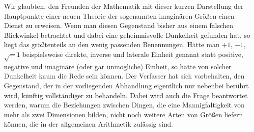 \newpage
Wir glaubten, den Freunden der Mathematik mit dieser kurzen Darstellung der Hauptpunkte einer neuen Theorie der sogenannten imaginären Größen einen Dienst zu erweisen. Wenn man diesen Gegenstand bisher aus einem falschen Blickwinkel betrachtet und dabei eine geheimnisvolle Dunkelheit
gefunden hat, so liegt das größtenteils an den wenig passenden Benennungen. Hätte man $+1$, $-1$, $\surd-1$ beispielsweise direkte, inverse und laterale Einheit genannt statt positive, negative und imaginäre (oder gar unmögliche) Einheit, so hätte von solcher Dunkelheit kaum die Rede sein können. Der Verfasser hat sich vorbehalten, den Gegenstand, der in der vorliegenden Abhandlung eigentlich nur nebenbei berührt wird, künftig vollständiger zu behandeln. Dabei wird auch die Frage beantwortet werden, warum die Beziehungen zwischen Dingen, die eine Mannigfaltigkeit von mehr als zwei Dimensionen bilden, nicht noch weitere Arten von Größen liefern können, die in der allgemeinen Arithmetik zulässig sind.

